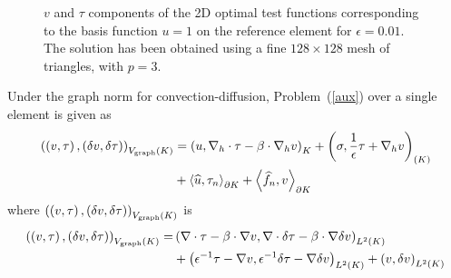 \documentclass[11pt,onecolumn]{scrartcl}
\newcommand{\LRp}[1]{\left( #1 \right)}
\newcommand{\LRa}[1]{\left\langle #1 \right\rangle}
\newcommand{\Grad} {\ensuremath{\nabla}}
\newcommand{\uh}{\widehat{u}}
\newcommand{\fnh}{\widehat{f}_n}
\newcommand{\grad}{\nabla}
\renewcommand{\div}{\grad \cdot}
\begin{document}
\begin{figure}[!h]
\centering
{}
\caption{$v$ and $\tau$ components of the 2D optimal test functions corresponding to the basis function $u=1$ on the reference element for $\epsilon = 0.01$. The solution has been obtained using a fine $128\times128$ mesh of triangles, with $p = 3$. }
\label{fig:optTestBoundary}
\end{figure}

Under the graph norm for convection-diffusion, Problem~(\ref{aux}) over a single element is given as
\begin{align*}
\LRp{\LRp{v,\tau},\LRp{\delta v,\delta \tau}}_{V_{\rm graph}(K)} &= \LRp{u, \Grad_h\cdot \tau - \beta\cdot \Grad_h v}_{K} + \LRp{\sigma, \frac{1}{\epsilon}\tau + \Grad_h v}_{(K)} \\
&+ \LRa{\uh,\tau_n}_{\partial K} + \LRa{\fnh,v}_{\partial K}
\end{align*}
where $\LRp{\LRp{v,\tau},\LRp{\delta v,\delta \tau}}_{V_{\rm graph}(K)}$ is 
\begin{align*}
\LRp{\LRp{v,\tau},\LRp{\delta v,\delta \tau}}_{V_{\rm graph}(K)} =& \LRp{\div\tau - \beta \cdot \grad v,\div\delta \tau - \beta \cdot \grad \delta v}_{L^2(K)} \\
&+ \LRp{{\epsilon}^{-1} \tau -  \grad v,{\epsilon}^{-1} \delta \tau -  \grad \delta v}_{L^2(K)} + \LRp{v,\delta v}_{L^2(K)} 
\end{align*}
\end{document}
